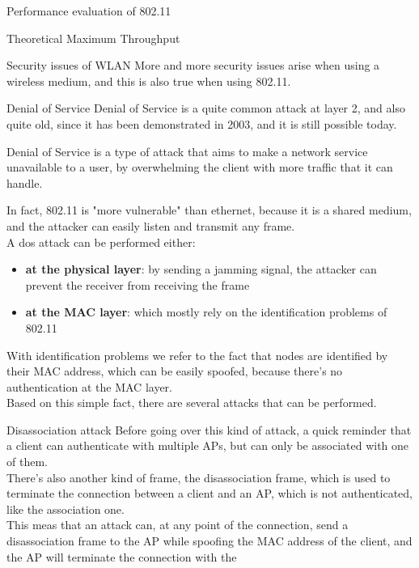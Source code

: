 \begin{section}{Performance evaluation of 802.11}
\begin{subsection}{Theoretical Maximum Throughput}
\begin{figure}[H]
    \end{figure}
  \end{subsection}
\end{section}
\begin{section}{Security issues of WLAN}
  More and more security issues arise when using a wireless medium, and this is also true when using
  802.11.
  \begin{subsection}{Denial of Service}
    Denial of Service is a quite common attack at layer 2, and also quite old, since it has been demonstrated in
    2003, and it is still possible today.
    \begin{boxH}
      Denial of Service is a type of attack that aims to make a network service unavailable to 
      a user, by overwhelming the client with more traffic that it can handle.
    \end{boxH}
    In fact, 802.11 is "more vulnerable" than ethernet, because it is a shared medium, and the attacker
    can easily listen and transmit any frame.\\
    A dos attack can be performed either:
    \begin{itemize}
      \item \textbf{at the physical layer}: by sending a jamming signal, the attacker can prevent the 
        receiver from receiving the frame
      \item \textbf{at the MAC layer}: which mostly rely on the identification problems of 802.11
    \end{itemize}
    With identification problems we refer to the fact that nodes are identified by their MAC address,
    which can be easily spoofed, because there's no authentication at the MAC layer.\\
    Based on this simple fact, there are several attacks that can be performed.
    \begin{subsubsection}{Disassociation attack}
      Before going over this kind of attack, a quick reminder that a client can authenticate with
      multiple APs, but can only be associated with one of them.\\
      There's also another kind of frame, the disassociation frame, which is used to terminate the
      connection between a client and an AP, which is not authenticated, like the association one.\\
      This meas that an attack can, at any point of the connection, send a disassociation frame to the
      AP while spoofing the MAC address of the client, and the AP will terminate the connection with the

\end{subsubsection}
\end{subsection}
\end{section}
